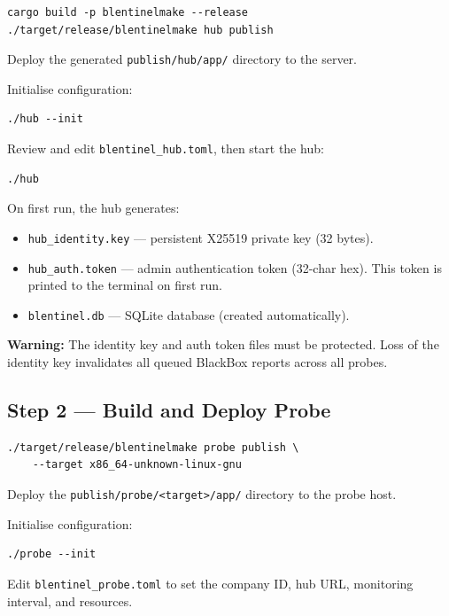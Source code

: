 \documentclass[12pt]{report}
\begin{document}
\begin{lstlisting}
cargo build -p blentinelmake --release
./target/release/blentinelmake hub publish
\end{lstlisting}

Deploy the generated \texttt{publish/hub/app/} directory to the server.

Initialise configuration:

\begin{lstlisting}
./hub --init
\end{lstlisting}

Review and edit \texttt{blentinel\_hub.toml}, then start the hub:

\begin{lstlisting}
./hub
\end{lstlisting}

On first run, the hub generates:

\begin{itemize}
    \item \texttt{hub\_identity.key} --- persistent X25519 private key (32
          bytes).
    \item \texttt{hub\_auth.token} --- admin authentication token (32-char
          hex). This token is printed to the terminal on first run.
    \item \texttt{blentinel.db} --- SQLite database (created automatically).
\end{itemize}

\textcolor{warnorange}{\textbf{Warning:}} The identity key and auth token
files must be protected. Loss of the identity key invalidates all queued
BlackBox reports across all probes.

\subsection{Step 2 --- Build and Deploy Probe}

\begin{lstlisting}
./target/release/blentinelmake probe publish \
    --target x86_64-unknown-linux-gnu
\end{lstlisting}

Deploy the \texttt{publish/probe/<target>/app/} directory to the probe host.

Initialise configuration:

\begin{lstlisting}
./probe --init
\end{lstlisting}

Edit \texttt{blentinel\_probe.toml} to set the company ID, hub URL, monitoring
interval, and resources.
\end{document}
